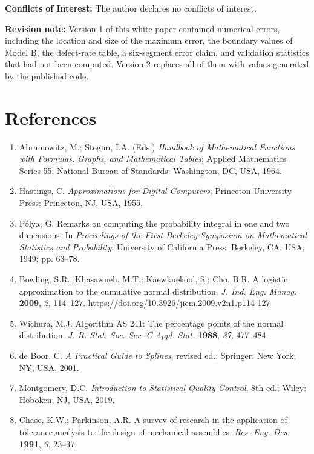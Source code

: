\documentclass[10pt,a4paper]{article}
\begin{document}
\vspace{4pt}\noindent\textbf{Conflicts of Interest:} The author declares no conflicts of interest.

\vspace{4pt}\noindent\textbf{Revision note:} Version 1 of this white paper contained numerical errors, including the location and size of the maximum error, the boundary values of Model B, the defect-rate table, a six-segment error claim, and validation statistics that had not been computed. Version 2 replaces all of them with values generated by the published code.

\section*{References}
\begin{enumerate}[label={\arabic*.},leftmargin=1.6em,itemsep=1pt]
\item Abramowitz, M.; Stegun, I.A. (Eds.) \textit{Handbook of Mathematical Functions with Formulas, Graphs, and Mathematical Tables}; Applied Mathematics Series 55; National Bureau of Standards: Washington, DC, USA, 1964.
\item Hastings, C. \textit{Approximations for Digital Computers}; Princeton University Press: Princeton, NJ, USA, 1955.
\item P\'olya, G. Remarks on computing the probability integral in one and two dimensions. In \textit{Proceedings of the First Berkeley Symposium on Mathematical Statistics and Probability}; University of California Press: Berkeley, CA, USA, 1949; pp. 63--78.
\item Bowling, S.R.; Khasawneh, M.T.; Kaewkuekool, S.; Cho, B.R. A logistic approximation to the cumulative normal distribution. \textit{J. Ind. Eng. Manag.} \textbf{2009}, \textit{2}, 114--127. https://doi.org/10.3926/jiem.2009.v2n1.p114-127
\item Wichura, M.J. Algorithm AS 241: The percentage points of the normal distribution. \textit{J. R. Stat. Soc. Ser. C Appl. Stat.} \textbf{1988}, \textit{37}, 477--484.
\item de Boor, C. \textit{A Practical Guide to Splines}, revised ed.; Springer: New York, NY, USA, 2001.
\item Montgomery, D.C. \textit{Introduction to Statistical Quality Control}, 8th ed.; Wiley: Hoboken, NJ, USA, 2019.
\item Chase, K.W.; Parkinson, A.R. A survey of research in the application of tolerance analysis to the design of mechanical assemblies. \textit{Res. Eng. Des.} \textbf{1991}, \textit{3}, 23--37.

\end{enumerate}
\end{document}

